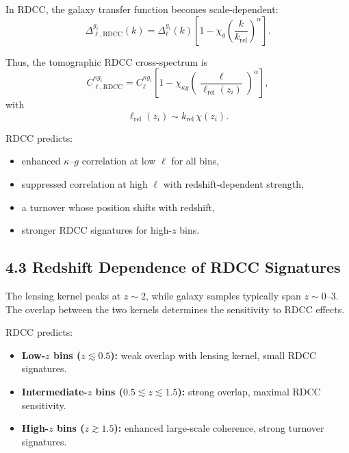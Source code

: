 \documentclass[11pt,a4paper]{article}
\begin{document}
In RDCC, the galaxy transfer function becomes scale-dependent:
\begin{equation}
    \Delta_{\ell,\mathrm{RDCC}}^{g_{i}}(k)
    = \Delta_{\ell}^{g_{i}}(k)
      \left[
        1 - \chi_{g}
        \left(\frac{k}{k_{\mathrm{rel}}}\right)^{\alpha}
      \right].
\end{equation}

Thus, the tomographic RDCC cross-spectrum is
\begin{equation}
    C_{\ell,\mathrm{RDCC}}^{\kappa g_{i}}
    = C_{\ell}^{\kappa g_{i}}
      \left[
        1 - \chi_{\kappa g}
        \left(\frac{\ell}{\ell_{\mathrm{rel}}(z_{i})}\right)^{\alpha}
      \right],
\end{equation}
with
\begin{equation}
    \ell_{\mathrm{rel}}(z_{i})
    \sim k_{\mathrm{rel}}\,\chi(z_{i}).
\end{equation}

RDCC predicts:

\begin{itemize}
    \item enhanced $\kappa$–$g$ correlation at low $\ell$ for all bins,
    \item suppressed correlation at high $\ell$ with redshift-dependent strength,
    \item a turnover whose position shifts with redshift,
    \item stronger RDCC signatures for high-$z$ bins.
\end{itemize}

\subsection*{4.3 Redshift Dependence of RDCC Signatures}

The lensing kernel peaks at $z \sim 2$, while galaxy samples typically span $z \sim 0$–$3$. 
The overlap between the two kernels determines the sensitivity to RDCC effects.

RDCC predicts:

\begin{itemize}
    \item \textbf{Low-$z$ bins ($z \lesssim 0.5$):}
    weak overlap with lensing kernel, small RDCC signatures.
    \item \textbf{Intermediate-$z$ bins ($0.5 \lesssim z \lesssim 1.5$):}
    strong overlap, maximal RDCC sensitivity.
    \item \textbf{High-$z$ bins ($z \gtrsim 1.5$):}
    enhanced large-scale coherence, strong turnover signatures.
\end{itemize}
\end{document}
